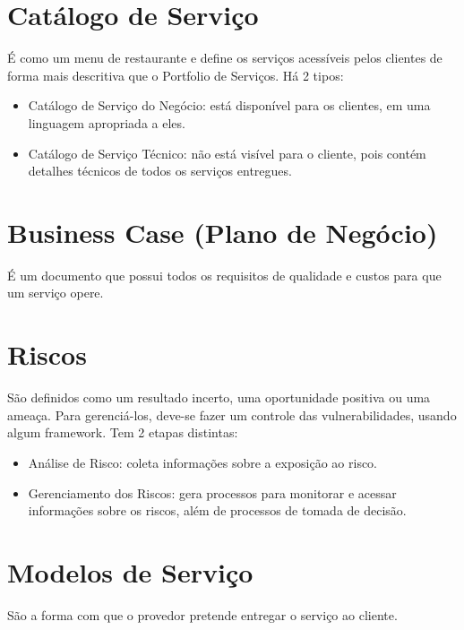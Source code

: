 \section{Catálogo de Serviço}
É como um menu de restaurante e define os serviços acessíveis pelos clientes de
forma mais descritiva que o Portfolio de Serviços. Há 2 tipos:
\begin{itemize}
    \item Catálogo de Serviço do Negócio: está disponível para os clientes, em
        uma linguagem apropriada a eles.
    \item Catálogo de Serviço Técnico: não está visível para o cliente, pois
        contém detalhes técnicos de todos os serviços entregues.
\end{itemize}


\section{Business Case (Plano de Negócio)}
É um documento que possui todos os requisitos de qualidade e custos para que um
serviço opere.


\section{Riscos}
São definidos como um resultado incerto, uma oportunidade positiva ou uma
ameaça. Para gerenciá-los, deve-se fazer um controle das vulnerabilidades,
usando algum framework. Tem 2 etapas distintas:
\begin{itemize}
	\item Análise de Risco: coleta informações sobre a exposição ao risco.
    \item Gerenciamento dos Riscos: gera processos para monitorar e acessar
        informações sobre os riscos, além de processos de tomada de decisão.
\end{itemize}


\section{Modelos de Serviço}
São a forma com que o provedor pretende entregar o serviço ao cliente.


